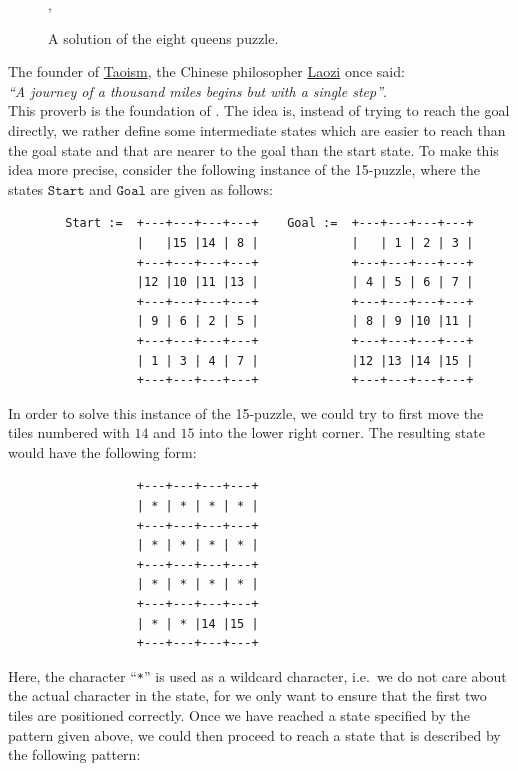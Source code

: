 \begin{figure}[!ht]
\centering
{},
\caption{A solution of the eight queens puzzle.}
\label{fig:queens.pdf}
\end{figure}
\pagebreak

\exercise
The founder of \href{https://en.wikipedia.org/wiki/Taoism}{Taoism}, the Chinese philosopher
\href{https://en.wikipedia.org/wiki/Laozi}{Laozi} once said:
\\[0.2cm]
\hspace*{1.3cm}
\textsl{``A journey of a thousand miles begins but with a single step''}.
\\[0.2cm]
This proverb is the foundation of .  The idea is, instead of trying to reach
the goal directly, we rather define some intermediate states which are easier to reach than the goal state and
that are nearer to the goal than the start state.  To make this idea more precise, consider the following instance of the
15-puzzle, where the states $\texttt{Start}$ and $\texttt{Goal}$ are given as follows:
\begin{verbatim}
        Start :=  +---+---+---+---+    Goal :=  +---+---+---+---+
                  |   |15 |14 | 8 |             |   | 1 | 2 | 3 |
                  +---+---+---+---+             +---+---+---+---+
                  |12 |10 |11 |13 |             | 4 | 5 | 6 | 7 |
                  +---+---+---+---+             +---+---+---+---+
                  | 9 | 6 | 2 | 5 |             | 8 | 9 |10 |11 |
                  +---+---+---+---+             +---+---+---+---+
                  | 1 | 3 | 4 | 7 |             |12 |13 |14 |15 |
                  +---+---+---+---+             +---+---+---+---+
 \end{verbatim}
 In order to solve this instance of the 15-puzzle, we could try to first move the tiles numbered with $14$ and
 $15$ into the lower right  corner.  The resulting state would have the following form:
 \begin{verbatim}
                  +---+---+---+---+
                  | * | * | * | * |
                  +---+---+---+---+
                  | * | * | * | * |
                  +---+---+---+---+
                  | * | * | * | * |
                  +---+---+---+---+
                  | * | * |14 |15 |
                  +---+---+---+---+
 \end{verbatim}
 Here, the character ``\texttt{*}'' is used as a wildcard character, i.e.~we do not care about the actual
 character in the state, for we only want to ensure that the first two tiles are positioned correctly.  Once we have reached a
 state specified by the pattern given above, we could then proceed to reach a state that is described by the
 following pattern:


